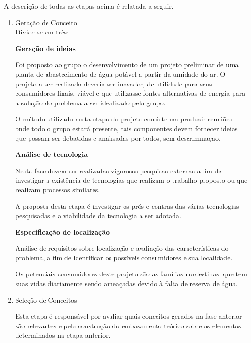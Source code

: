   A descrição de todas as etapas acima é relatada a seguir.
  
  \begin{enumerate}
   \parindent=1.25cm
   
   \item Geração de Conceito\\
      
      \noindent
      Divide-se em três:
      
      \noindent
      \subitem \textbf{Geração de ideias}
      
      Foi proposto ao grupo o desenvolvimento de um projeto preliminar de uma planta de abastecimento de água potável a partir 
      da umidade do ar. O projeto a ser realizado deveria ser inovador, de utilidade para seus consumidores finais, viável e
      que utilizasse fontes alternativas de energia para a solução do problema a ser idealizado pelo grupo.
      
      O método utilizado nesta etapa do projeto consiste em produzir reuniões onde todo o grupo estará presente, tais componentes 
      devem fornecer ideias que possam ser debatidas e analisadas por todos, sem descriminação.
      
      \noindent
      \subitem \textbf{Análise de tecnologia}
      
      Nesta fase devem ser realizadas vigorosas pesquisas externas a fim de investigar a existência de tecnologias que realizam o
      trabalho proposto ou que realizam processos similares. 
	    
      A proposta desta etapa é investigar os prós e contras das várias tecnologias pesquisadas e a viabilidade da tecnologia 
      a ser adotada.
      
      \noindent
      \subitem \textbf{Especificação de localização}
      
      Análise de requisitos sobre localização e avaliação das características do problema, a fim de identificar os possíveis 
      consumidores e sua localidade. 
      
      Os potenciais consumidores deste projeto são as famílias nordestinas, que tem suas vidas diariamente sendo ameaçadas 
      devido à falta de reserva de água.
   
  \item Seleção de Conceitos
  
    Esta etapa é responsável por avaliar quais conceitos gerados na fase anterior são relevantes e pela construção do
    embasamento teórico sobre os elementos determinados na etapa anterior. 
  

\end{enumerate}
